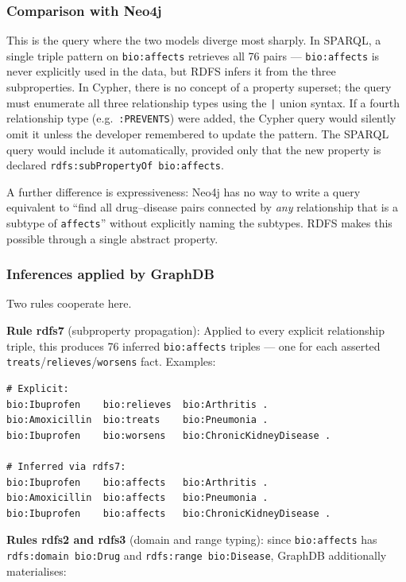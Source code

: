 \documentclass[11pt,a4paper]{article}
\begin{document}
\subsubsection*{Comparison with Neo4j}

This is the query where the two models diverge most sharply.
In SPARQL, a single triple pattern on \texttt{bio:affects} retrieves all 76
pairs — \texttt{bio:affects} is never explicitly used in the data, but RDFS
infers it from the three subproperties.  In Cypher, there is no concept of a
property superset; the query must enumerate all three relationship types
using the \texttt{|} union syntax.  If a fourth relationship type (e.g.\
\texttt{:PREVENTS}) were added, the Cypher query would silently omit it unless
the developer remembered to update the pattern.  The SPARQL query would include
it automatically, provided only that the new property is declared
\texttt{rdfs:subPropertyOf bio:affects}.

A further difference is expressiveness: Neo4j has no way to write a query
equivalent to ``find all drug–disease pairs connected by \emph{any} relationship
that is a subtype of \texttt{affects}'' without explicitly naming the subtypes.
RDFS makes this possible through a single abstract property.

\subsubsection*{Inferences applied by GraphDB}

Two rules cooperate here.

\textbf{Rule rdfs7} (subproperty propagation): Applied to every explicit relationship triple, this produces 76 inferred
\texttt{bio:affects} triples — one for each asserted
\texttt{treats}/\texttt{relieves}/\texttt{worsens} fact.  Examples:

\begin{lstlisting}[style=turtle]
# Explicit:
bio:Ibuprofen    bio:relieves  bio:Arthritis .
bio:Amoxicillin  bio:treats    bio:Pneumonia .
bio:Ibuprofen    bio:worsens   bio:ChronicKidneyDisease .

# Inferred via rdfs7:
bio:Ibuprofen    bio:affects   bio:Arthritis .
bio:Amoxicillin  bio:affects   bio:Pneumonia .
bio:Ibuprofen    bio:affects   bio:ChronicKidneyDisease .
\end{lstlisting}

\textbf{Rules rdfs2 and rdfs3} (domain and range typing): since
\texttt{bio:affects} has \texttt{rdfs:domain bio:Drug} and
\texttt{rdfs:range bio:Disease}, GraphDB additionally materialises:
\end{document}
